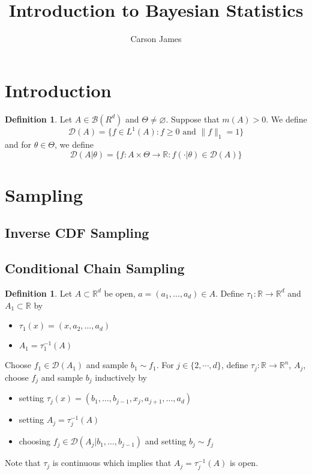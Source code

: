 \documentclass[12pt]{amsart}
\theoremstyle{definition}
\newtheorem{defn}[definition]{Definition}
\newcommand{\R}{\mathbb{R}}
\newcommand{\MB}{\mathcal{B}}
\newcommand{\MD}{\mathcal{D}}
\begin{document}
	
	\title{Introduction to Bayesian Statistics}
	\author{Carson James}
	\maketitle
	
	\tableofcontents
	
	\section{Introduction}
	\begin{defn}
		Let $A \in \MB(R^d)$ and $\Theta \neq \varnothing$. Suppose that $m(A) > 0$. We define 
		$$\MD(A) = \{f \in L^1(A) : f \geq 0 \text{ and } \|f\|_1 = 1\}$$ 
		and for $\theta \in \Theta$, we define
		$$\MD(A|\theta) = \{f: A \times \Theta \rightarrow \R : f(\cdot| \theta) \in \MD(A)\}$$
	\end{defn}
	
	\section{Sampling}
	
	\subsection{Inverse CDF Sampling}
	
	\subsection{Conditional Chain Sampling}
	\begin{defn}
	Let $A \subset \R^d$ be open, $a = (a_1, \dots, a_d) \in A$. Define $\tau_1:\R \rightarrow \R^d$ and $A_1 \subset \R$ by 
	\begin{itemize}
	\item $\tau_1(x) = (x, a_2, \ldots, a_d)$
	\item $A_1 = \tau_1^{-1}(A)$
\end{itemize}	 
	Choose $f_1 \in \MD(A_1)$ and sample $b_1 \sim f_1$. For $j \in \{2, \cdots, d\}$, define $\tau_j: \R \rightarrow \R^n$, $A_j$, choose $f_j$ and sample $b_j$ inductively by 
	\begin{itemize}
	\item setting $\tau_j(x) = (b_1, \dots, b_{j-1}, x_j, a_{j+1}, \dots, a_d)$  
	\item setting $A_j = \tau_j^{-1}(A)$
	\item choosing $f_j \in \MD(A_j|b_1, \ldots, b_{j-1})$
	and
	setting $b_j \sim f_j$ 
	\end{itemize}
	Note that $\tau_j$ is continuous which implies that $A_j = \tau_j^{-1}(A)$ is open.
	
	\end{defn}	
	
\end{document}
